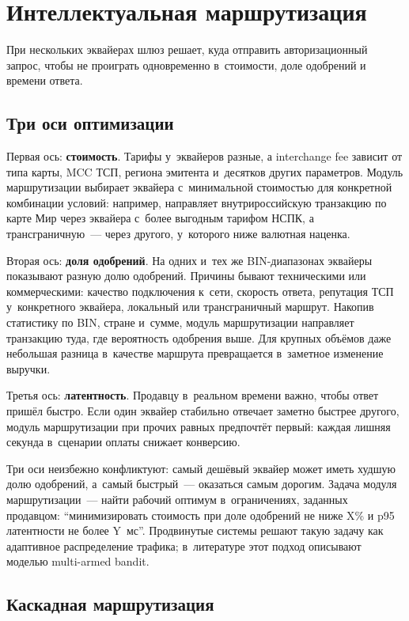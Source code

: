 \section{Интеллектуальная маршрутизация}\label{sec:gw-routing}

При нескольких эквайерах шлюз решает, куда
отправить авторизационный запрос, чтобы не проиграть
одновременно в~стоимости, доле одобрений и времени ответа.

\subsection*{Три оси оптимизации}

Первая ось: \textbf{стоимость}. Тарифы у~эквайеров разные,
а interchange fee зависит от типа карты, MCC ТСП, региона
эмитента и~десятков других параметров.
Модуль маршрутизации выбирает эквайера с~минимальной
стоимостью для конкретной комбинации условий: например,
направляет внутрироссийскую транзакцию по карте Мир через
эквайера с~более выгодным тарифом НСПК, а трансграничную~---
через другого, у~которого ниже валютная наценка.

Вторая ось: \textbf{доля одобрений}. На одних и~тех же
BIN-диапазонах эквайеры показывают разную долю одобрений.
Причины бывают техническими или коммерческими:
качество подключения к~сети, скорость ответа, репутация ТСП
у~конкретного эквайера, локальный или трансграничный маршрут.
Накопив статистику по BIN, стране и~сумме, модуль маршрутизации
направляет транзакцию туда, где вероятность одобрения выше.
Для крупных объёмов даже небольшая разница в~качестве маршрута
превращается в~заметное изменение выручки.

Третья ось: \textbf{латентность}. Продавцу в~реальном времени
важно, чтобы ответ пришёл быстро. Если один эквайер стабильно
отвечает заметно быстрее другого, модуль маршрутизации при
прочих равных предпочтёт первый: каждая лишняя секунда
в~сценарии оплаты снижает конверсию.

Три оси неизбежно конфликтуют: самый дешёвый эквайер
может иметь худшую долю одобрений, а~самый быстрый~--- оказаться
самым дорогим. Задача модуля маршрутизации~--- найти рабочий
оптимум в~ограничениях, заданных продавцом: \enquote{минимизировать
  стоимость при доле одобрений не ниже X\% и p95 латентности
не более Y~мс}. Продвинутые системы решают такую задачу
как адаптивное распределение трафика; в~литературе этот подход
описывают моделью multi-armed bandit.

\subsection*{Каскадная маршрутизация}

